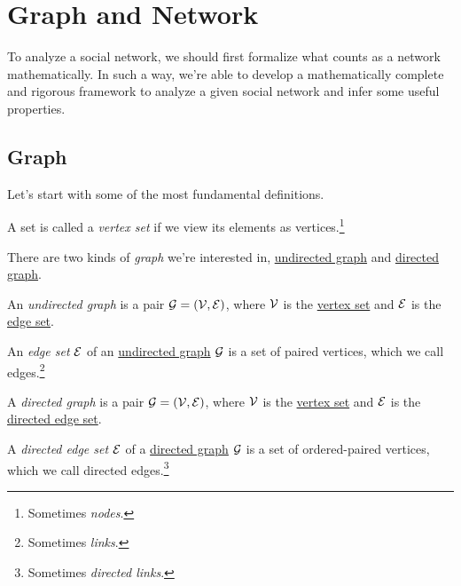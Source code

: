\chapter{Graph and Network}
To analyze a social network, we should first formalize what counts as a network mathematically. In such a way, we're able to
develop a mathematically complete and rigorous framework to analyze a given social network and infer some useful properties.

\section{Graph}
Let's start with some of the most fundamental definitions.

\begin{definition}\label{def:vertex-set}
	A set is called a \emph{vertex set} if we view its elements as vertices.\footnote{Sometimes \emph{nodes}.}
\end{definition}

\begin{definition}[Graph]\label{def:graph}
	There are two kinds of \emph{graph} we're interested in, \hyperref[def:undirected-graph]{undirected graph} and \hyperref[def:directed-graph]{directed graph}.
	\begin{definition}\label{def:undirected-graph}
		An \emph{undirected graph} is a pair \(\mathcal{G} = (\mathcal{\MakeUppercase{v}} , \mathcal{\MakeUppercase{e}} )\), where \(\mathcal{\MakeUppercase{v}} \) is
		the \hyperref[def:vertex-set]{vertex set} and \(\mathcal{\MakeUppercase{e}} \) is the \hyperref[def:edge-set]{edge set}.

		\begin{definition}\label{def:edge-set}
			An \emph{edge set} \(\mathcal{\MakeUppercase{e}} \) of an \hyperref[def:undirected-graph]{undirected graph} \(\mathcal{\MakeUppercase{g}} \) is a set of paired vertices, which we call edges.\footnote{Sometimes \emph{links}.}
		\end{definition}
	\end{definition}

	\begin{definition}\label{def:directed-graph}
		A \emph{directed graph} is a pair \(\mathcal{\MakeUppercase{g}} = (\mathcal{\MakeUppercase{v}}, \mathcal{\MakeUppercase{e}} )\), where \(\mathcal{\MakeUppercase{v}} \)
		is the \hyperref[def:vertex-set]{vertex set} and \(\mathcal{\MakeUppercase{e}} \) is the \hyperref[def:directed-edge-set]{directed edge set}.

		\begin{definition}\label{def:directed-edge-set}
			A \emph{directed edge set} \(\mathcal{\MakeUppercase{e}} \) of a \hyperref[def:directed-graph]{directed graph} \(\mathcal{\MakeUppercase{g}} \) is a set of ordered-paired vertices, which we call directed edges.\footnote{Sometimes \emph{directed links}.}
		\end{definition}
	\end{definition}
\end{definition}

